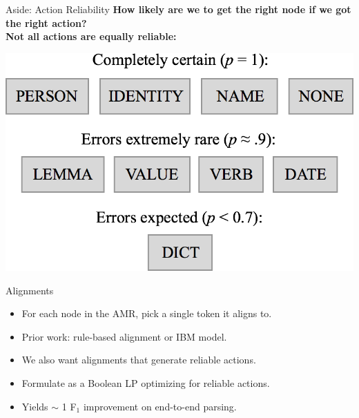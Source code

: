 \documentclass[hyperref]{beamer}
\newcommand\hh[1]{\textbf{\textcolor[rgb]{0.5,0,0}{#1}}}
\begin{document}
\begin{frame}{Aside: Action Reliability}
\hh{How likely are we to get the right node if we got the right action?} \\
\pause
\vspace{2em}
\hh{Not all actions are equally reliable:}
\begin{center}
\includegraphics[scale=0.20]{informativeness.png}
\end{center}
\end{frame}

\begin{frame}{Alignments}
\begin{itemize}
\item For each node in the AMR, pick a single token it aligns to.
\item Prior work: rule-based alignment or IBM model.
\vspace{2em}
\item We also want alignments that generate reliable actions.
\pause
\vspace{2em}
\item Formulate as a Boolean LP optimizing for reliable actions.
\item Yields $\sim$ 1 F$_1$ improvement on end-to-end parsing.
\end{itemize}
\end{frame}
\end{document}
